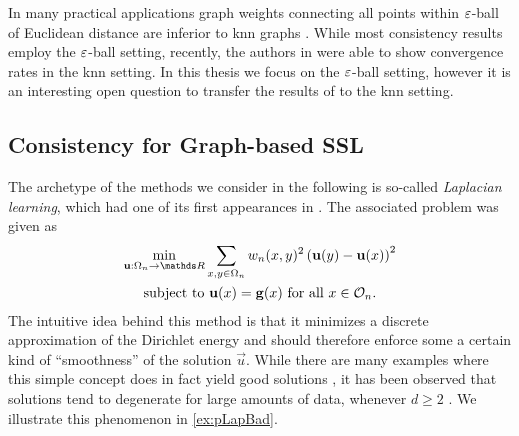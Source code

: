 %
%
%
\begin{remark}{}{}
In many practical applications graph weights connecting all points within $\varepsilon$-ball of Euclidean distance are inferior to knn graphs \cite{calder2020poisson, flores2019algorithms, calder2022improved}. While most consistency results employ the $\varepsilon$-ball setting, recently, the authors in \cite{calder2022improved} were able to show convergence rates in the knn setting. In this thesis we focus on the $\varepsilon$-ball setting, however it is an interesting open question to transfer the results of \cite{roith2022continuum, bungert2021uniform, bungert2022ratio} to the knn setting.
\end{remark}
%
%
\subsection{Consistency for Graph-based SSL}\label{sec:CSSL}
%
The archetype of the methods we consider in the following is so-called \emph{Laplacian learning}, which had one of its first appearances in 
\cite{zhu2003semi}. The associated problem was given as
%
\begin{gather}\label{eq:SSL_Laplacian}
\begin{gathered}
\min_{\vec u:\domain_n\to\R} \sum_{x,y\in\domain_n} w_n(x,y)^2 
\left(\vec u(y) - \vec u(x) \right)^2\\
\text{subject to } \vec u(x) = \vec g(x) \text{ for all } x\in\conset_n.
\end{gathered}
\end{gather}
%
%
%
The intuitive idea behind this method is that it minimizes a discrete approximation of the Dirichlet energy and should therefore enforce some a certain kind of \enquote{smoothness} of the solution $\vec u$. While there are many examples where this simple concept does in fact yield good solutions \cite{zhu2003semi, zhou2005regularization}, it has been observed that solutions tend to degenerate for large amounts of data, whenever $d\geq 2$ \cite{nadler2009statistical, alamgir2011phase, el2016asymptotic}. We illustrate this phenomenon in \cref{ex:pLapBad}.
%
